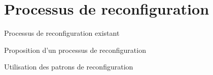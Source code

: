 \section{Processus de reconfiguration} 

\begin{frame}{Processus de reconfiguration existant}
\end{frame}

\begin{frame}{Proposition d'un processus de reconfiguration}
\end{frame}

\begin{frame}{Utilisation des patrons de reconfiguration}
\end{frame}
